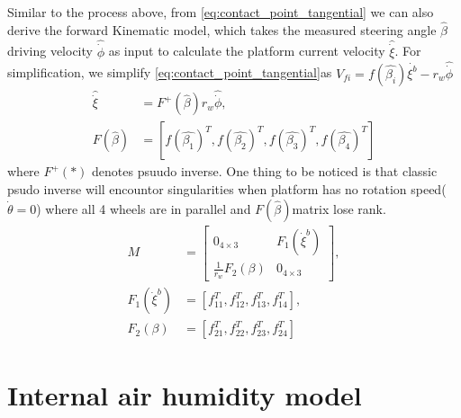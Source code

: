 Similar to the process above, from \cref{eq:contact_point_tangential} we can also derive the forward Kinematic model, which takes the measured steering angle $\hat{\beta}$ driving velocity $\hat{\dot{\phi}}$ as input to 
calculate the platform current velocity $\hat{\dot{\xi}}$. For simplification, we simplify \cref{eq:contact_point_tangential}as $V_{fi}=f(\hat{\beta_i})\dot{\xi^b} -r_w\hat{\dot{\phi}}$
\begin{equation}
	\label{eq:forwardKinematics}
	\begin{split}
	\hat{\dot{\xi}} &= F^+(\hat{\beta})r_w\hat{\dot{\phi}},\\
	F(\hat{\beta}) &= [f(\hat{\beta_1})^T, f(\hat{\beta_2})^T, f(\hat{\beta_3})^T, f(\hat{\beta_4})^T]
	\end{split}
	\end{equation}
where $F^+(*)$ denotes psuudo inverse. One thing to be noticed is that classic psudo inverse will encountor singularities when platform has no rotation speed($\dot{\theta}=0$) where all 4 wheels are in parallel and 
$F(\hat{\beta})$matrix lose rank.
\begin{align}\label{eq:M}
	M &= 
	\begin{bmatrix}
	0_{4\times3} & F_1(\dot{\xi}^b)\\
	\frac{1}{r_w}F_2(\beta) & 0_{4\times3}
	\end{bmatrix},\\
	F_1(\dot{\xi}^b) &=[f_{11}^T,f_{12}^T,f_{13}^T,f_{14}^T],\\
	F_2(\beta) &=[f_{21}^T,f_{22}^T,f_{23}^T,f_{24}^T]
	\end{align}

\section{Internal air humidity model}
\label{sec:hum}
